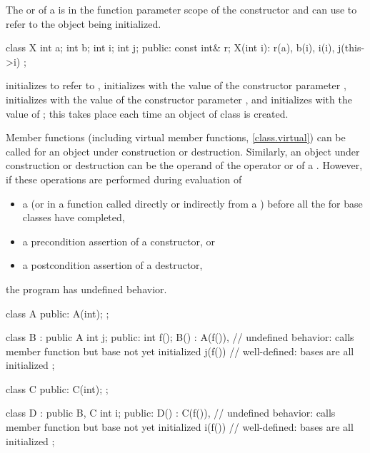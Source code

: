 \pnum
{}%
\begin{note}
The  or 
of a 
is in the function parameter scope of the constructor
and can use  to refer to the object being initialized.
\end{note}
\begin{example}
\begin{codeblock}
class X {
  int a;
  int b;
  int i;
  int j;
public:
  const int& r;
  X(int i): r(a), b(i), i(i), j(this->i) { }
};
\end{codeblock}

initializes
to refer to
,
initializes
with the value of the constructor parameter
,
initializes
with the value of the constructor parameter
,
and initializes
with the value of
;
this takes place each time an object of class
is created.
\end{example}

\pnum
{}%
Member functions (including virtual member functions, \ref{class.virtual}) can be
called for an object under construction or destruction.
Similarly, an object under construction or destruction can be the operand of the
operator or of a
.
However, if these operations are performed
during evaluation of
\begin{itemize}
\item
a 
(or in a function called directly or indirectly from a
)
before all the
for base classes have completed,
\item
a precondition assertion of a constructor, or
\item
a postcondition assertion of a destructor,
\end{itemize}
the program has undefined behavior.
\begin{example}
\begin{codeblock}
class A {
public:
  A(int);
};

class B : public A {
  int j;
public:
  int f();
  B() : A(f()),     // undefined behavior: calls member function but base  not yet initialized
  j(f()) { }        // well-defined: bases are all initialized
};

class C {
public:
  C(int);
};

class D : public B, C {
  int i;
public:
  D() : C(f()),     // undefined behavior: calls member function but base  not yet initialized
  i(f()) { }        // well-defined: bases are all initialized
};
\end{codeblock}
\end{example}

